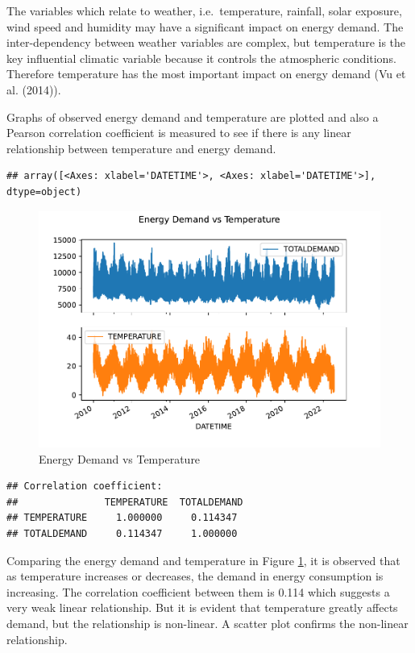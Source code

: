 \documentclass[mstat,12pt]{unswthesis}
\begin{document}
The variables which relate to weather, i.e.~temperature, rainfall, solar
exposure, wind speed and humidity may have a significant impact on
energy demand. The inter-dependency between weather variables are
complex, but temperature is the key influential climatic variable
because it controls the atmospheric conditions. Therefore temperature
has the most important impact on energy demand (Vu et al. (2014)).

Graphs of observed energy demand and temperature are plotted and also a
Pearson correlation coefficient is measured to see if there is any
linear relationship between temperature and energy demand.

\begin{verbatim}
## array([<Axes: xlabel='DATETIME'>, <Axes: xlabel='DATETIME'>], dtype=object)
\end{verbatim}

\begin{figure}[H]
\includegraphics[width=1\linewidth,]{ZZSC9020_Group_Report_files/figure-latex/plot-energy-demand-temperature-by-year-5} \caption{Energy Demand vs Temperature}\label{fig:plot-energy-demand-temperature-by-year}
\end{figure}

\begin{verbatim}
## Correlation coefficient:
##               TEMPERATURE  TOTALDEMAND
## TEMPERATURE     1.000000     0.114347
## TOTALDEMAND     0.114347     1.000000
\end{verbatim}

Comparing the energy demand and temperature in Figure
\ref{fig:plot-energy-demand-temperature-by-year}, it is observed that as
temperature increases or decreases, the demand in energy consumption is
increasing. The correlation coefficient between them is 0.114 which
suggests a very weak linear relationship. But it is evident that
temperature greatly affects demand, but the relationship is non-linear.
A scatter plot confirms the non-linear relationship.
\end{document}
